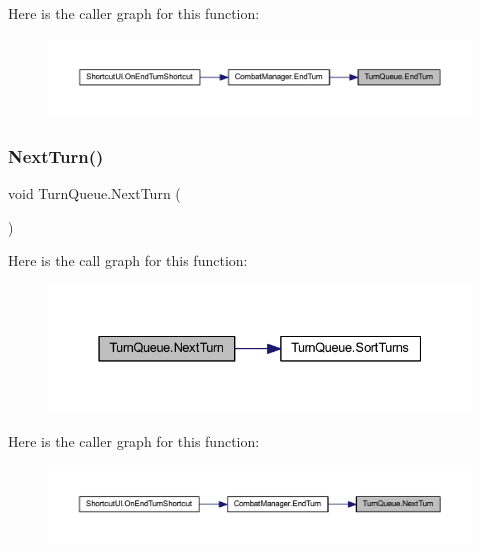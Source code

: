 Here is the caller graph for this function\+:\nopagebreak
\begin{figure}[H]
\begin{center}
\leavevmode
\includegraphics[width=350pt]{class_turn_queue_aadfdf0f72201cdc985ad2dbb9520eaee_icgraph}
\end{center}
\end{figure}
\mbox{\label{class_turn_queue_acae6f91ff8006307a04d4ee9362c1b7e}} 
\subsubsection{\texorpdfstring{NextTurn()}{NextTurn()}}
{\footnotesize\ttfamily void Turn\+Queue.\+Next\+Turn (\begin{DoxyParamCaption}{ }\end{DoxyParamCaption})}

Here is the call graph for this function\+:\nopagebreak
\begin{figure}[H]
\begin{center}
\leavevmode
\includegraphics[width=331pt]{class_turn_queue_acae6f91ff8006307a04d4ee9362c1b7e_cgraph}
\end{center}
\end{figure}
Here is the caller graph for this function\+:\nopagebreak
\begin{figure}[H]
\begin{center}
\leavevmode
\includegraphics[width=350pt]{class_turn_queue_acae6f91ff8006307a04d4ee9362c1b7e_icgraph}
\end{center}
\end{figure}
\mbox{\label{class_turn_queue_ae1c735b715ec963c76f0291cb9629338}} 
